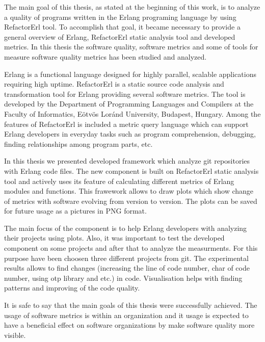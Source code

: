 The main goal of this thesis, as stated at the beginning of this work, is to analyze a quality of programs written in the Erlang programing language by using RefactorErl tool. To accomplish that goal, it became necessary to provide a general overview of Erlang, RefactorErl static analysis tool and developed metrics. In this thesis the software quality, software metrics and some of tools for measure software quality metrics has been studied and analyzed.

Erlang is a functional language designed for highly parallel, scalable applications requiring high uptime. RefactorErl is a static source code analysis and transformation tool for Erlang providing several software metrics. The tool is developed by the Department of Programming Languages and Compilers at the Faculty of Informatics, Eötvös Loránd University, Budapest, Hungary. Among the features of RefactorErl is included a metric query language which can support Erlang developers in everyday tasks such as program comprehension, debugging, finding relationships among program parts, etc.

In this thesis we presented developed framework which analyze git repositories with Erlang code files. The new component is built on RefactorErl static analysis tool and actively uses its feature of calculating different metrics of Erlang modules and functions. This frawework allows to draw plots which show change of metrics with software evolving from version to version. The plots can be saved for future usage as a pictures in PNG format. 

The main focus of the component is to help Erlang developers with analyzing their projects using plots. Also, it was important to test the developed component on some projects and after that to analyze the measurments. For this purpose have been choosen three different projects from git. The experimental results allows to find changes (increasing the line of code number, char of code number, using otp library and etc.) in code. Visualisation helps with finding patterns and improving of the code quality.

It is safe to say that the main goals of this thesis were successfully achieved. The usage of software metrics is within an organization and it usage is expected to have a beneficial effect on software organizations by make software quality more visible.